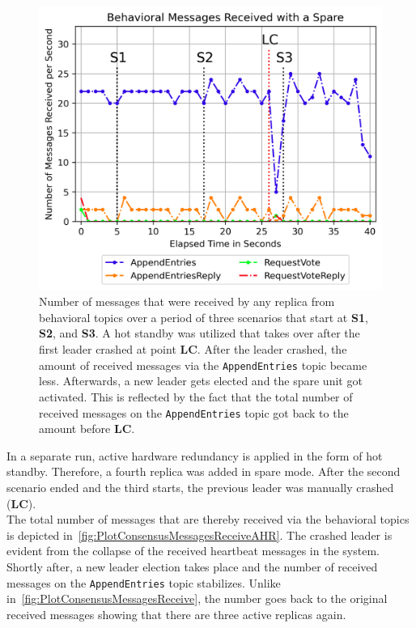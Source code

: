\begin{figure}[!hb]
	\centering
	\includegraphics[width=0.8\linewidth]{images/plots/ConsensusMessagesReceiveAHR}
	\caption{Number of messages that were received by any replica from behavioral topics over a period of three scenarios that start at \textbf{S1}, \textbf{S2}, and \textbf{S3}. A hot standby was utilized that takes over after the first leader crashed at point \textbf{LC}. After the leader crashed, the amount of received messages via the \texttt{AppendEntries} topic became less. Afterwards, a new leader gets elected and the spare unit got activated. This is reflected by the fact that the total number of received messages on the \texttt{AppendEntries} topic got back to the amount before \textbf{LC}.}
	\label{fig:PlotConsensusMessagesReceiveAHR}
\end{figure}

In a separate run, active hardware redundancy is applied in the form of hot standby.
Therefore, a fourth replica was added in spare mode.
After the second scenario ended and the third starts, the previous leader was manually crashed (\textbf{LC}).
\\

The total number of messages that are thereby received via the behavioral topics is depicted in~\autoref{fig:PlotConsensusMessagesReceiveAHR}.
The crashed leader is evident from the collapse of the received heartbeat messages in the system.
Shortly after, a new leader election takes place and the number of received messages on the \texttt{AppendEntries} topic stabilizes.
Unlike in~\autoref{fig:PlotConsensusMessagesReceive}, the number goes back to the original received messages showing that there are three active replicas again.


